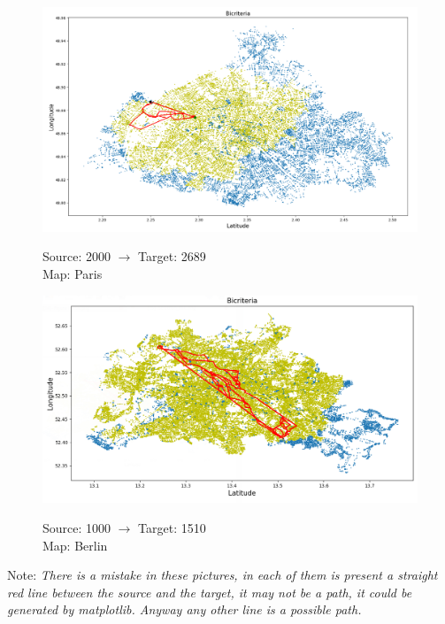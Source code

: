 \documentclass[a4paper,11pt]{report}
\begin{document}
\begin{figure}[H]
	\centering
	\includegraphics[width=\textwidth]{img/mapOutput/2000->2689Bicriteria.png}
	\label{fig:Bicriteria2}
	\hfill
	\begin{center}
		Source: 2000 $\to$ Target: 2689\\Map: Paris
	\end{center}
\end{figure}
\begin{figure}[H]
	\centering
	\includegraphics[width=\textwidth]{img/mapOutput/1000->1510BerlinBicriteria.png}
	\label{fig:Bicriteria3}
	\hfill
	\begin{center}
		Source: 1000 $\to$ Target: 1510\\Map: Berlin
	\end{center}
\end{figure}
\begin{flushleft}
	{\tiny Note: \textit{There is a mistake in these pictures, in each of them is present a straight red line between the source and the target, it may not be a path, it could be generated by matplotlib. Anyway any other line is a possible path.}}
\end{flushleft}
\end{document}
